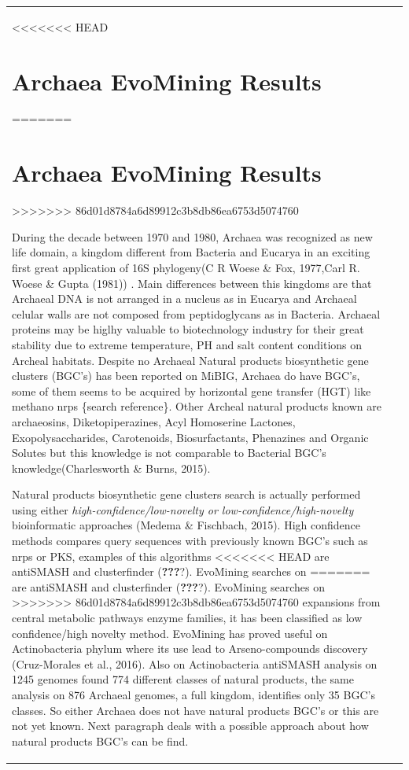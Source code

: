 \documentclass[12pt,twoside]{reedthesis}
\begin{document}
\begin{longtable}[c]{@{}lr@{}}
<<<<<<< HEAD
  \hypertarget{refux5flabels}{\chapter{Archaea EvoMining
  Results}\label{refux5flabels}}
=======
  \hypertarget{ref_labels}{\chapter{Archaea EvoMining
  Results}\label{ref_labels}}
>>>>>>> 86d01d8784a6d89912c3b8db86ea6753d5074760
  
  During the decade between 1970 and 1980, Archaea was recognized as new
  life domain, a kingdom different from Bacteria and Eucarya in an
  exciting first great application of 16S phylogeny(C R Woese \& Fox,
  1977,Carl R. Woese \& Gupta (1981)) . Main differences between this
  kingdoms are that Archaeal DNA is not arranged in a nucleus as in
  Eucarya and Archaeal celular walls are not composed from peptidoglycans
  as in Bacteria. Archaeal proteins may be higlhy valuable to
  biotechnology industry for their great stability due to extreme
  temperature, PH and salt content conditions on Archeal habitats. Despite
  no Archaeal Natural products biosynthetic gene clusters (BGC's) has been
  reported on MiBIG, Archaea do have BGC's, some of them seems to be
  acquired by horizontal gene transfer (HGT) like methano nrps \{search
  reference\}. Other Archeal natural products known are archaeosins,
  Diketopiperazines, Acyl Homoserine Lactones, Exopolysaccharides,
  Carotenoids, Biosurfactants, Phenazines and Organic Solutes but this
  knowledge is not comparable to Bacterial BGC's knowledge(Charlesworth \&
  Burns, 2015).
  
  Natural products biosynthetic gene clusters search is actually performed
  using either \emph{high-confidence/low-novelty or
  low-confidence/high-novelty} bioinformatic approaches (Medema \&
  Fischbach, 2015). High confidence methods compares query sequences with
  previously known BGC's such as nrps or PKS, examples of this algorithms
<<<<<<< HEAD
  are antiSMASH and clusterfinder (\textbf{???}?). EvoMining searches on
=======
  are antiSMASH and clusterfinder ({\textbf{???}}?). EvoMining searches on
>>>>>>> 86d01d8784a6d89912c3b8db86ea6753d5074760
  expansions from central metabolic pathways enzyme families, it has been
  classified as low confidence/high novelty method. EvoMining has proved
  useful on Actinobacteria phylum where its use lead to Arseno-compounds
  discovery (Cruz-Morales et al., 2016). Also on Actinobacteria antiSMASH
  analysis on 1245 genomes found 774 different classes of natural
  products, the same analysis on 876 Archaeal genomes, a full kingdom,
  identifies only 35 BGC's classes. So either Archaea does not have
  natural products BGC's or this are not yet known. Next paragraph deals
  with a possible approach about how natural products BGC's can be find.
  

\end{longtable}
\end{document}

